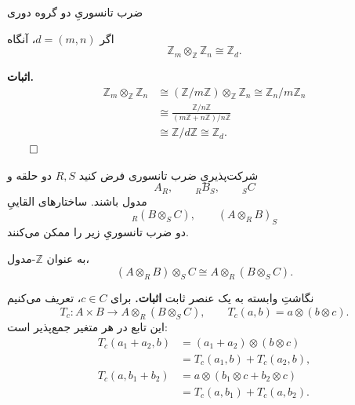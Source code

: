\begin{frame}[t]{ضرب تانسوریِ دو گروه دوری}
\label{lec20:cyclic-tensor}
\begin{corollary}
اگر \(d=(m,n)\)، آنگاه
\[
    \mathbb Z_m\otimes_{\mathbb Z}\mathbb Z_n\cong\mathbb Z_d.
\]
\end{corollary}
\textbf{اثبات.}
\[
\begin{aligned}
\mathbb Z_m\otimes_{\mathbb Z}\mathbb Z_n
 &\cong(\mathbb Z/m\mathbb Z)\otimes_{\mathbb Z}\mathbb Z_n
 \cong\mathbb Z_n/m\mathbb Z_n\\
 &\cong\frac{\mathbb Z/n\mathbb Z}{(m\mathbb Z+n\mathbb Z)/n\mathbb Z}\\
 &\cong\mathbb Z/d\mathbb Z\cong\mathbb Z_d.
\end{aligned}
\]
\hfill\(\qed\)
\end{frame}

\begin{frame}[t]{شرکت‌پذیریِ ضرب تانسوری}
\label{lec20:associativity}
فرض کنید \(R,S\) دو حلقه و
\[
    A_R,\qquad {}_R B_S,\qquad {}_S C
\]
مدول باشند. ساختارهای القاییِ
\[
    {}_R(B\otimes_S C),\qquad (A\otimes_R B)_S
\]
دو ضرب تانسوریِ زیر را ممکن می‌کنند.
\begin{theorem}
به عنوان \(\mathbb Z\)-مدول،
\[
    (A\otimes_R B)\otimes_S C\cong A\otimes_R(B\otimes_S C).
\]
\end{theorem}
\end{frame}

\begin{frame}[t]{نگاشتِ وابسته به یک عنصر ثابت}
\label{lec20:fixed-c-map}
\textbf{اثبات.} برای \(c\in C\)، تعریف می‌کنیم
\[
    T_c:A\times B\longrightarrow A\otimes_R(B\otimes_S C),
    \qquad T_c(a,b)=a\otimes(b\otimes c).
\]
این تابع در هر متغیر جمع‌پذیر است:
\[
\begin{aligned}
T_c(a_1+a_2,b)
 &=(a_1+a_2)\otimes(b\otimes c)\\
 &=T_c(a_1,b)+T_c(a_2,b),\\[2pt]
T_c(a,b_1+b_2)
 &=a\otimes(b_1\otimes c+b_2\otimes c)\\
 &=T_c(a,b_1)+T_c(a,b_2).
\end{aligned}
\]
\end{frame}

